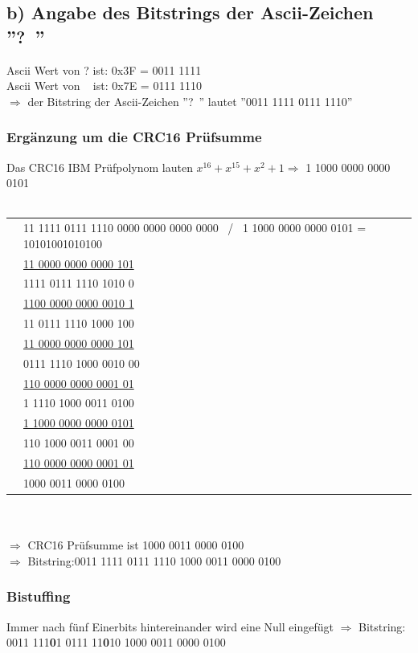 \documentclass[numbers=noendperiod]{scrartcl}
\begin{document}
\subsection{b) Angabe des Bitstrings der Ascii-Zeichen ''?~''}
Ascii Wert von ? ist: 0x3F = 0011 1111 \\
Ascii Wert von ~ ist: 0x7E = 0111 1110 \\
\(\Rightarrow \) der Bitstring der Ascii-Zeichen ''?~'' lautet ''0011 1111 0111 1110''
\subsubsection*{Ergänzung um die CRC16 Prüfsumme}
Das CRC16 IBM Prüfpolynom lauten \(x^{16}+x^{15}+x^2 + 1 \Rightarrow \) 1 1000 0000 0000 0101 \\ \\
  \begin{tabular}{cl}
&11 1111 0111 1110 0000 0000 0000 0000 \ / \ 1 1000 0000 0000 0101 = 10101001010100\\
&\underline{11 0000 0000 0000 101}\\
   &\phantom{00 }1111 0111 1110 1010 0\\
   &\phantom{00 }\underline{1100 0000 0000 0010 1}\\
     &\phantom{00 00}11 0111 1110 1000 100\\
	 &\phantom{00 00}\underline{11 0000 0000 0000 101}\\
		&\phantom{00 0000 }0111 1110 1000 0010 00\\
		 &\phantom{00 0000 0}\underline{110 0000 0000 0001 01}\\
		   &\phantom{00 0000 000}1 1110 1000 0011 0100\\
		   &\phantom{00 0000 000}\underline{1 1000 0000 0000 0101}\\
		      &\phantom{00 0000 0000 0}110 1000 0011 0001 00\\
		      &\phantom{00 0000 0000 0}\underline{110 0000 0000 0001 01}\\
		          &\phantom{00 0000 0000 0000 }1000 0011 0000 0100\\
		        \end{tabular}\\ \\
		        \(\Rightarrow\) CRC16 Prüfsumme ist 1000 0011 0000 0100\\
		        \(\Rightarrow\) Bitstring:0011 1111 0111 1110 1000 0011 0000 0100
\subsubsection*{Bistuffing}
Immer nach fünf Einerbits hintereinander wird eine Null eingefügt
 \(\Rightarrow\) Bitstring: 0011 111\textbf{0}1 0111 11\textbf{0}10 1000 0011 0000 0100
\end{document}
